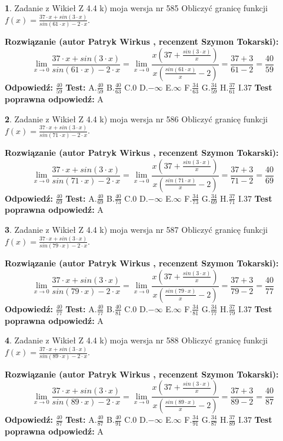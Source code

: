 \documentclass[12pt, a4paper]{article}
\theoremstyle{definition} %
\newtheorem{zad}{}
\newcommand{\zadStart}[1]{\begin{zad}#1\newline}
\newcommand{\zadStop}{\end{zad}}
\newcommand{\rozwStart}[2]{\noindent \textbf{Rozwiązanie (autor #1 , recenzent #2): }\newline}
\newcommand{\rozwStop}{\newline}
\newcommand{\odpStart}{\noindent \textbf{Odpowiedź:}\newline}
\newcommand{\odpStop}{\newline}
\newcommand{\testStart}{\noindent \textbf{Test:}\newline}
\newcommand{\testStop}{\newline}
\newcommand{\kluczStart}{\noindent \textbf{Test poprawna odpowiedź:}\newline}
\newcommand{\kluczStop}{\newline}
\begin{document}
\zadStart{Zadanie z Wikieł Z 4.4 k) moja wersja nr 585}
Obliczyć granicę funkcji $f(x)=\frac{37\cdot x +sin(3\cdot x)}{sin(61\cdot x) -2\cdot x}$.
\zadStop
\rozwStart{Patryk Wirkus}{Szymon Tokarski}
$$\lim\limits_{x\to 0}\frac{37\cdot x +sin(3\cdot x)}{sin(61\cdot x) -2\cdot x}
=\lim\limits_{x\to 0}\frac{x(37+\frac{sin(3\cdot x)}{x})}{x(\frac{sin(61\cdot x)}{x}-2)}
=\frac{37+3}{61-2} = \frac{40}{59}$$
\rozwStop
\odpStart
$\frac{40}{59}$
\odpStop
\testStart
A.$\frac{40}{59}$
B.$\frac{40}{63}$
C.$0$
D.$-\infty$
E.$\infty$
F.$\frac{34}{63}$
G.$\frac{34}{59}$
H.$\frac{37}{61}$
I.$37$
\testStop
\kluczStart
A
\kluczStop



\zadStart{Zadanie z Wikieł Z 4.4 k) moja wersja nr 586}
Obliczyć granicę funkcji $f(x)=\frac{37\cdot x +sin(3\cdot x)}{sin(71\cdot x) -2\cdot x}$.
\zadStop
\rozwStart{Patryk Wirkus}{Szymon Tokarski}
$$\lim\limits_{x\to 0}\frac{37\cdot x +sin(3\cdot x)}{sin(71\cdot x) -2\cdot x}
=\lim\limits_{x\to 0}\frac{x(37+\frac{sin(3\cdot x)}{x})}{x(\frac{sin(71\cdot x)}{x}-2)}
=\frac{37+3}{71-2} = \frac{40}{69}$$
\rozwStop
\odpStart
$\frac{40}{69}$
\odpStop
\testStart
A.$\frac{40}{69}$
B.$\frac{40}{73}$
C.$0$
D.$-\infty$
E.$\infty$
F.$\frac{34}{73}$
G.$\frac{34}{69}$
H.$\frac{37}{71}$
I.$37$
\testStop
\kluczStart
A
\kluczStop



\zadStart{Zadanie z Wikieł Z 4.4 k) moja wersja nr 587}
Obliczyć granicę funkcji $f(x)=\frac{37\cdot x +sin(3\cdot x)}{sin(79\cdot x) -2\cdot x}$.
\zadStop
\rozwStart{Patryk Wirkus}{Szymon Tokarski}
$$\lim\limits_{x\to 0}\frac{37\cdot x +sin(3\cdot x)}{sin(79\cdot x) -2\cdot x}
=\lim\limits_{x\to 0}\frac{x(37+\frac{sin(3\cdot x)}{x})}{x(\frac{sin(79\cdot x)}{x}-2)}
=\frac{37+3}{79-2} = \frac{40}{77}$$
\rozwStop
\odpStart
$\frac{40}{77}$
\odpStop
\testStart
A.$\frac{40}{77}$
B.$\frac{40}{81}$
C.$0$
D.$-\infty$
E.$\infty$
F.$\frac{34}{81}$
G.$\frac{34}{77}$
H.$\frac{37}{79}$
I.$37$
\testStop
\kluczStart
A
\kluczStop



\zadStart{Zadanie z Wikieł Z 4.4 k) moja wersja nr 588}
Obliczyć granicę funkcji $f(x)=\frac{37\cdot x +sin(3\cdot x)}{sin(89\cdot x) -2\cdot x}$.
\zadStop
\rozwStart{Patryk Wirkus}{Szymon Tokarski}
$$\lim\limits_{x\to 0}\frac{37\cdot x +sin(3\cdot x)}{sin(89\cdot x) -2\cdot x}
=\lim\limits_{x\to 0}\frac{x(37+\frac{sin(3\cdot x)}{x})}{x(\frac{sin(89\cdot x)}{x}-2)}
=\frac{37+3}{89-2} = \frac{40}{87}$$
\rozwStop
\odpStart
$\frac{40}{87}$
\odpStop
\testStart
A.$\frac{40}{87}$
B.$\frac{40}{91}$
C.$0$
D.$-\infty$
E.$\infty$
F.$\frac{34}{91}$
G.$\frac{34}{87}$
H.$\frac{37}{89}$
I.$37$
\testStop
\kluczStart
A
\kluczStop
\end{document}
